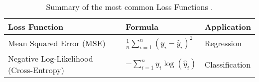 \begin{table}[htb!]
\caption{Summary of the most common Loss Functions \cite{goodfellow_deep_2016}.}
\label{Tables:LossFunctions}
\centering
\footnotesize
\begin{tabularx}{\textwidth}{@{}lXl@{}}
\toprule
\textbf{Loss Function} & \textbf{Formula} & \textbf{Application} \\
\midrule
Mean Squared Error (MSE) & \( \frac{1}{n} \sum_{i=1}^n (y_i - \hat{y}_i)^2 \) & Regression \\
\addlinespace
Negative Log-Likelihood (Cross-Entropy) & \( -\sum_{i=1}^n y_i \log(\hat{y}_i) \) & Classification \\
\bottomrule
\end{tabularx}
\end{table}
